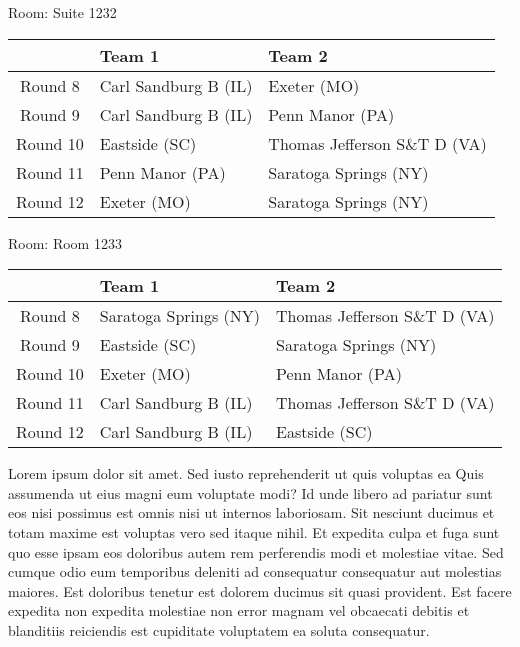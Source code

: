 \documentclass{article}%
\begin{document}
\vspace*{8pt}%
\linebreak%
\begin{flushleft}%
\begin{Large}%
Room: Suite 1232%
\end{Large}%
\end{flushleft}%
\begin{tabularx}{\textwidth}{|c|Y|Y|}%
\hline%
&Team 1&Team 2\\%
\hline%
Round 8&Carl Sandburg B (IL)&Exeter (MO)\\%
Round 9&Carl Sandburg B (IL)&Penn Manor (PA)\\%
Round 10&Eastside (SC)&Thomas Jefferson S\&T D (VA)\\%
Round 11&Penn Manor (PA)&Saratoga Springs (NY)\\%
Round 12&Exeter (MO)&Saratoga Springs (NY)\\%
\hline%
\end{tabularx}%
\vspace*{8pt}%
\linebreak%
\begin{flushleft}%
\begin{Large}%
Room: Room 1233%
\end{Large}%
\end{flushleft}%
\begin{tabularx}{\textwidth}{|c|Y|Y|}%
\hline%
&Team 1&Team 2\\%
\hline%
Round 8&Saratoga Springs (NY)&Thomas Jefferson S\&T D (VA)\\%
Round 9&Eastside (SC)&Saratoga Springs (NY)\\%
Round 10&Exeter (MO)&Penn Manor (PA)\\%
Round 11&Carl Sandburg B (IL)&Thomas Jefferson S\&T D (VA)\\%
Round 12&Carl Sandburg B (IL)&Eastside (SC)\\%
\hline%
\end{tabularx}%
\vspace*{8pt}%
\linebreak%
\newline%
Lorem ipsum dolor sit amet. Sed iusto reprehenderit ut quis voluptas ea Quis assumenda ut eius magni eum voluptate modi? Id unde libero ad pariatur sunt eos nisi possimus est omnis nisi ut internos laboriosam. Sit nesciunt ducimus et totam maxime est voluptas vero sed itaque nihil. Et expedita culpa et fuga sunt quo esse ipsam eos doloribus autem rem perferendis modi et molestiae vitae.\newline%
\newline%
Sed cumque odio eum temporibus deleniti ad consequatur consequatur aut molestias maiores. Est doloribus tenetur est dolorem ducimus sit quasi provident. Est facere expedita non expedita molestiae non error magnam vel obcaecati debitis et blanditiis reiciendis est cupiditate voluptatem ea soluta consequatur.%
\newpage%
\end{document}
